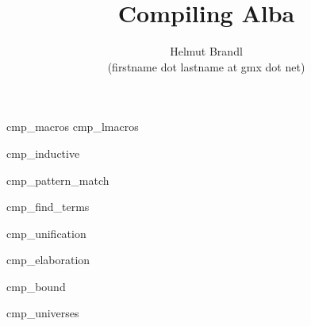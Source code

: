 \documentclass[10pt]{article}
\begin{document}


\title{
    Compiling Alba
}

\author{
    Helmut Brandl
    \\
    \scriptsize (firstname dot lastname at gmx dot net)
}
\date{}

\maketitle




\tableofcontents

 {cmp_macros}
 {cmp_lmacros}

\lstset{language=alba}


 {cmp_inductive}

 {cmp_pattern_match}

 {cmp_find_terms}

 {cmp_unification}

 {cmp_elaboration}

 {cmp_bound}

 {cmp_universes}
\end{document}

